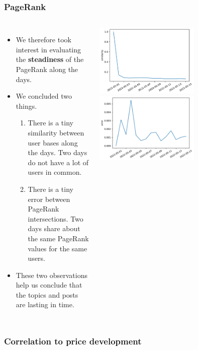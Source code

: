 \documentclass[aspectratio=169]{beamer}
\begin{document}
\begin{frame}[t]
    \frametitle{PageRank}
    \begin{columns}
    \begin{itemize}
        \item We therefore took interest in evaluating the \textbf{steadiness} of the PageRank along the days.
            \item We concluded two things.
        \begin{enumerate}
            \item There is a tiny similarity between user bases along the days. Two days do not have a lot of users in common. 
            \item There is a tiny error between PageRank intersections. Two days share about the same PageRank values for the same users.
        \end{enumerate}
    \item These two observations help us conclude that the topics and posts are lasting in time.
    \end{itemize}
        \includegraphics[width=0.6\textwidth]{figures/sim_days.pdf}
        \includegraphics[width=0.6\textwidth]{figures/error_days.pdf}
    \end{columns}
\end{frame}
\begin{frame}[t]
    \frametitle{Correlation to price development}
\end{frame}
\end{document}
